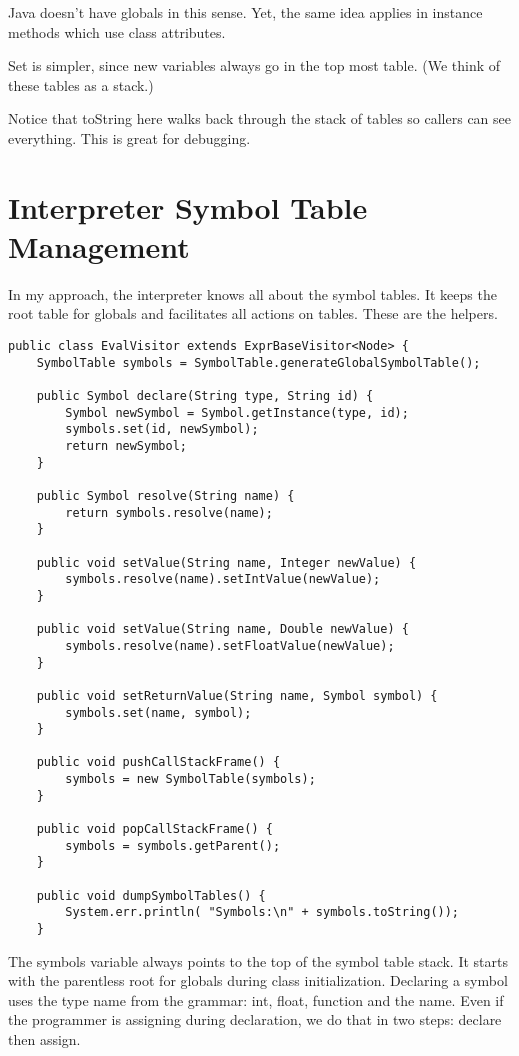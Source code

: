 Java doesn't have globals in this sense. Yet, the same idea applies in instance
methods which use class attributes.

Set is simpler, since new variables always go in the top most table. (We
think of these tables as a stack.)

Notice that toString here walks back through the stack of tables so callers
can see everything. This is great for debugging.

\section{Interpreter Symbol Table Management}

In my approach, the interpreter knows all about the symbol tables. It keeps the
root table for globals and facilitates all actions on tables. These are the helpers.

{\footnotesize
\begin{verbatim}
public class EvalVisitor extends ExprBaseVisitor<Node> {
    SymbolTable symbols = SymbolTable.generateGlobalSymbolTable();

    public Symbol declare(String type, String id) {
        Symbol newSymbol = Symbol.getInstance(type, id);
        symbols.set(id, newSymbol);
        return newSymbol;
    }

    public Symbol resolve(String name) {
        return symbols.resolve(name);
    }

    public void setValue(String name, Integer newValue) {
        symbols.resolve(name).setIntValue(newValue);
    }

    public void setValue(String name, Double newValue) {
        symbols.resolve(name).setFloatValue(newValue);
    }

    public void setReturnValue(String name, Symbol symbol) {
        symbols.set(name, symbol);
    }

    public void pushCallStackFrame() {
        symbols = new SymbolTable(symbols);
    }

    public void popCallStackFrame() {
        symbols = symbols.getParent();
    }

    public void dumpSymbolTables() {
        System.err.println( "Symbols:\n" + symbols.toString());
    }
\end{verbatim}
}

The symbols variable always points to the top of the symbol table stack.
It starts with the parentless root for globals during class initialization.
Declaring a symbol uses the type name from the grammar: int, float, function
and the name. Even if the programmer is assigning during declaration, we
do that in two steps: declare then assign.

